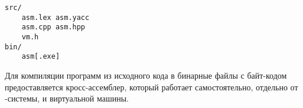 \clearpage
{}\label{basm}\secdown

\begin{verbatim}
src/
    asm.lex asm.yacc
    asm.cpp asm.hpp
    vm.h
bin/
    asm[.exe]
\end{verbatim}

\noindent
Для компиляции программ из исходного кода в бинарные файлы с байт-кодом
предоставляется кросс-ассемблер, который работает самостоятельно, отдельно от
\F-системы, и виртуальной машины.

\secup
